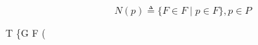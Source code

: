 $$N(p) \triangleq \{F \in F \mid p \in F\}, p \in P$$

$$T \triangleq \{G \subseteq F \mid (\forall
